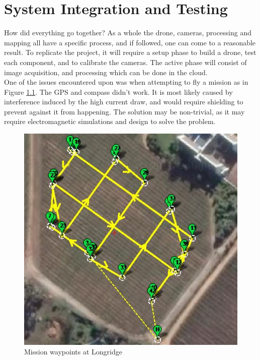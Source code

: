 \chapter{System Integration and Testing}

How did everything go together? As a whole the drone, cameras, processing and mapping all have a specific process, and if followed, one can come to a reasonable result. To replicate the project, it will require a setup phase to build a drone, test each component, and to calibrate the cameras. The active phase will consist of image acquisition, and processing which can be done in the cloud. \\

One of the issues encountered upon was when attempting to fly a mission as in Figure \ref{fig:longridge_waypoints}. The GPS and compass didn't work. It is most likely caused by interference induced by the high current draw, and would require shielding to prevent against it from happening. The solution may be non-trivial, as it may require electromagnetic simulations and design to solve the problem.

\begin{figure}[H]
\centering
\includegraphics[scale=0.4]{images/longridge_waypoints.jpg}
\caption{Mission waypoints at Longridge}
\label{fig:longridge_waypoints}
\end{figure}

%
%


